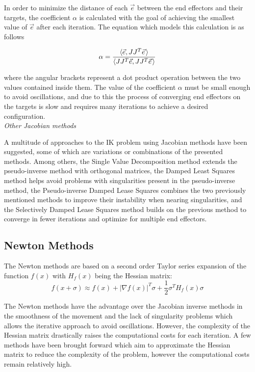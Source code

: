 In order to minimize the distance of each \(\vec{e}\) between  the end effectors and
their targets, the coefficient \(\alpha\) is calculated with the goal of
achieving the smallest value of \(\vec{e}\) after each iteration. The equation
which models this calculation is as follows

\begin{equation}
    \alpha = \frac
        {
            \langle\vec{e}, J J^T \pvec{e}\rangle
        }
        {
            \langle J J^T \vec{e},J J^T \pvec{e} \rangle
        }
\end{equation}

\noindent where the angular brackets represent a dot product operation between the two
values contained inside them. The value of the coefficient \(\alpha\) must be
small enough to avoid oscillations, and due to this the process of converging
end effectors on the targets is slow and requires many iterations to achieve
a desired configuration. \\

\noindent\textit{Other Jacobian methods}

A multitude of approaches to the IK problem using Jacobian methods have been
suggested, some of which are variations or combinations of the presented
methods. Among others, the Single Value Decomposition method extends the
pseudo-inverse method with orthogonal matrices, the Damped Least Squares method
helps avoid problems with singularities present in the pseudo-inverse method,
the Pseudo-inverse Damped Lease Squares combines the two previously mentioned
methods to improve their instability when nearing singularities, and the
Selectively Damped Lease Squares method builds on the previous method to
converge in fewer iterations and optimize for multiple end effectors.

\subsection{Newton Methods}
The Newton methods are based on a second order Taylor series expansion of the
function \(f(x)\) with \(H_f(x)\) being the Hessian matrix:
\begin{equation}
    f(x + \sigma) \approx f(x) + |\nabla f(x)|^T \sigma + \frac{1}{2} \sigma^T H_f(x)
    \sigma
\end{equation}

The Newton methods have the advantage over the Jacobian inverse methods in the
smoothness of the movement and the lack of singularity problems which allows the
iterative approach to avoid oscillations. However, the complexity of the Hessian
matrix drastically raises the computational costs for each iteration. A few
methods have been brought forward which aim to approximate the Hessian matrix
to reduce the complexity of the problem, however the computational costs remain
relatively high.

